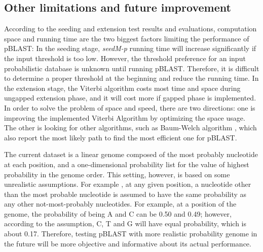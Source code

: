\documentclass[12pt]{article}
\begin{document}
\subsection{Other limitations and future improvement}

According to the seeding and extension test results and evaluations, computation space and running time are the two biggest factors limiting the performance of pBLAST: In the seeding stage, \textit{seedM-p} running time will increase significantly if the input threshold is too low. However, the threshold preference for an input probabilistic database is unknown until running pBLAST. Therefore, it is difficult to determine a proper threshold at the beginning and reduce the running time. In the extension stage, the Viterbi algorithm costs most time and space during ungapped extension phase, and it will cost more if gapped phase is implemented. In order to solve the problem of space and speed, there are two directions: one is improving the implemented Viterbi Algorithm by optimizing the space usage. The other is looking for other algorithms, such as Baum-Welch algorithm \cite{bilmes1998}, which also report the most likely path to find the most efficient one for pBLAST.

The current dataset is a linear genome composed of the most probably nucleotide at each position, and a one-dimensional probability list for the value of highest probability in the genome order. This setting, however, is based on some unrealistic assumptions. For example , at any given  position, a nucleotide other than the most probable nucleotide is assumed to have the same probability as any other not-most-probably nucleotides. For example, at a position of the genome, the probability of being A and C can be 0.50 and 0.49; however, according to the assumption, C, T and G will have equal probability, which is about 0.17. Therefore, testing pBLAST with more realistic probability genome in the future will be more objective and informative about its actual performance.



\clearpage


\end{document}
